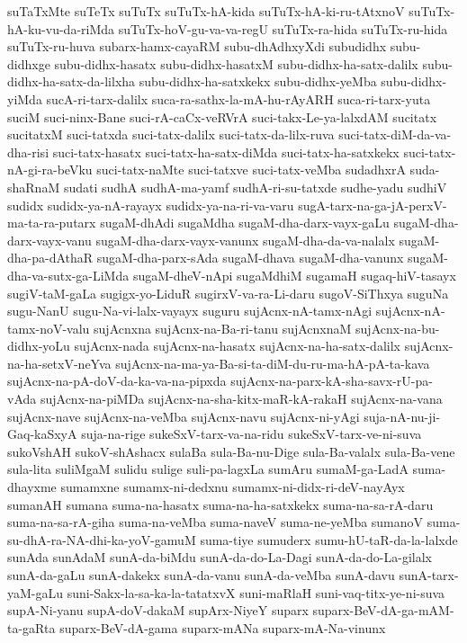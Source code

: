{suTaTxMte
suTeTx
suTuTx
suTuTx-hA-kida
suTuTx-hA-ki-ru-tAtxnoV
suTuTx-hA-ku-vu-da-riMda
suTuTx-hoV-gu-va-va-regU
suTuTx-ra-hida
suTuTx-ru-hida
suTuTx-ru-huva
subarx-hamx-cayaRM
subu-dhAdhxyXdi
subudidhx
subu-didhxge
subu-didhx-hasatx
subu-didhx-hasatxM
subu-didhx-ha-satx-dalilx
subu-didhx-ha-satx-da-lilxha
subu-didhx-ha-satxkekx
subu-didhx-yeMba
subu-didhx-yiMda
sucA-ri-tarx-dalilx
suca-ra-sathx-la-mA-hu-rAyARH
suca-ri-tarx-yuta
suciM
suci-ninx-Bane
suci-rA-caCx-veRVrA
suci-takx-Le-ya-lalxdAM
sucitatx
sucitatxM
suci-tatxda
suci-tatx-dalilx
suci-tatx-da-lilx-ruva
suci-tatx-diM-da-va-dha-risi
suci-tatx-hasatx
suci-tatx-ha-satx-diMda
suci-tatx-ha-satxkekx
suci-tatx-nA-gi-ra-beVku
suci-tatx-naMte
suci-tatxve
suci-tatx-veMba
sudadhxrA
suda-shaRnaM
sudati
sudhA
sudhA-ma-yamf
sudhA-ri-su-tatxde
sudhe-yadu
sudhiV
sudidx
sudidx-ya-nA-rayayx
sudidx-ya-na-ri-va-varu
sugA-tarx-na-ga-jA-perxV-ma-ta-ra-putarx
sugaM-dhAdi
sugaMdha
sugaM-dha-darx-vayx-gaLu
sugaM-dha-darx-vayx-vanu
sugaM-dha-darx-vayx-vanunx
sugaM-dha-da-va-nalalx
sugaM-dha-pa-dAthaR
sugaM-dha-parx-sAda
sugaM-dhava
sugaM-dha-vanunx
sugaM-dha-va-sutx-ga-LiMda
sugaM-dheV-nApi
sugaMdhiM
sugamaH
sugaq-hiV-tasayx
sugiV-taM-gaLa
sugigx-yo-LiduR
sugirxV-va-ra-Li-daru
sugoV-SiThxya
suguNa
sugu-NanU
sugu-Na-vi-lalx-vayayx
suguru
sujAcnx-nA-tamx-nAgi
sujAcnx-nA-tamx-noV-valu
sujAcnxna
sujAcnx-na-Ba-ri-tanu
sujAcnxnaM
sujAcnx-na-bu-didhx-yoLu
sujAcnx-nada
sujAcnx-na-hasatx
sujAcnx-na-ha-satx-dalilx
sujAcnx-na-ha-setxV-neYva
sujAcnx-na-ma-ya-Ba-si-ta-diM-du-ru-ma-hA-pA-ta-kava
sujAcnx-na-pA-doV-da-ka-va-na-pipxda
sujAcnx-na-parx-kA-sha-savx-rU-pa-vAda
sujAcnx-na-piMDa
sujAcnx-na-sha-kitx-maR-kA-rakaH
sujAcnx-na-vana
sujAcnx-nave
sujAcnx-na-veMba
sujAcnx-navu
sujAcnx-ni-yAgi
suja-nA-nu-ji-Gaq-kaSxyA
suja-na-rige
sukeSxV-tarx-va-na-ridu
sukeSxV-tarx-ve-ni-suva
sukoVshAH
sukoV-shAshacx
sulaBa
sula-Ba-nu-Dige
sula-Ba-valalx
sula-Ba-vene
sula-lita
suliMgaM
sulidu
sulige
suli-pa-lagxLa
sumAru
sumaM-ga-LadA
suma-dhayxme
sumamxne
sumamx-ni-dedxnu
sumamx-ni-didx-ri-deV-nayAyx
sumanAH
sumana
suma-na-hasatx
suma-na-ha-satxkekx
suma-na-sa-rA-daru
suma-na-sa-rA-giha
suma-na-veMba
suma-naveV
suma-ne-yeMba
sumanoV
suma-su-dhA-ra-NA-dhi-ka-yoV-gamuM
suma-tiye
sumuderx
sumu-hU-taR-da-la-lalxde
sunAda
sunAdaM
sunA-da-biMdu
sunA-da-do-La-Dagi
sunA-da-do-La-gilalx
sunA-da-gaLu
sunA-dakekx
sunA-da-vanu
sunA-da-veMba
sunA-davu
sunA-tarx-yaM-gaLu
suni-Sakx-la-sa-ka-la-tatatxvX
suni-maRlaH
suni-vaq-titx-ye-ni-suva
supA-Ni-yanu
supA-doV-dakaM
supArx-NiyeY
suparx
suparx-BeV-dA-ga-mAM-ta-gaRta
suparx-BeV-dA-gama
suparx-mANa
suparx-mA-Na-vinunx
}
